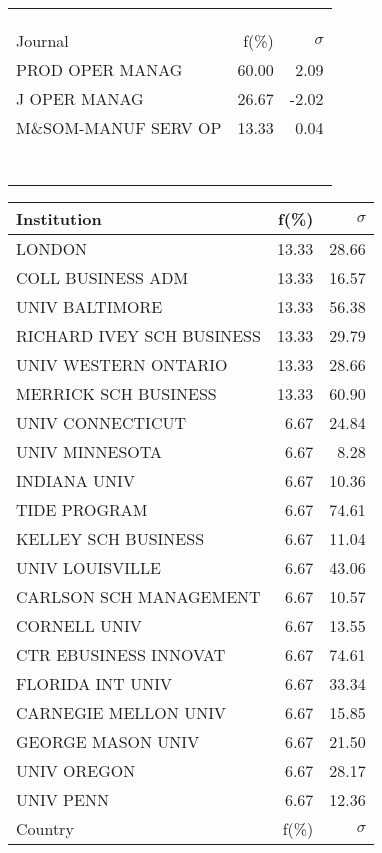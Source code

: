 \documentclass[a4paper,11pt]{report}
\begin{document}
\begin{landscape}
\begin{table}[!ht]
{\begin{tabular}{|l r  r|}
 &  & \\
 &  & \\
 &  & \\
\hline
\hline
Journal & f(\%) & $\sigma$\\
\hline
PROD OPER MANAG & 60.00 & 2.09\\
J OPER MANAG & 26.67 & -2.02\\
M\&SOM-MANUF SERV OP & 13.33 & 0.04\\
 &  & \\
 &  & \\
 &  & \\
 &  & \\
 &  & \\
 &  & \\
 &  & \\
\hline
\end{tabular}
}
{\scriptsize\begin{tabular}{|l r r|}
\hline
Institution & f(\%) & $\sigma$\\
\hline
LONDON & 13.33 & 28.66\\
COLL BUSINESS ADM & 13.33 & 16.57\\
UNIV BALTIMORE & 13.33 & 56.38\\
RICHARD IVEY SCH BUSINESS & 13.33 & 29.79\\
UNIV WESTERN ONTARIO & 13.33 & 28.66\\
MERRICK SCH BUSINESS & 13.33 & 60.90\\
UNIV CONNECTICUT & 6.67 & 24.84\\
UNIV MINNESOTA & 6.67 & 8.28\\
INDIANA UNIV & 6.67 & 10.36\\
TIDE PROGRAM & 6.67 & 74.61\\
KELLEY SCH BUSINESS & 6.67 & 11.04\\
UNIV LOUISVILLE & 6.67 & 43.06\\
CARLSON SCH MANAGEMENT & 6.67 & 10.57\\
CORNELL UNIV & 6.67 & 13.55\\
CTR EBUSINESS INNOVAT & 6.67 & 74.61\\
FLORIDA INT UNIV & 6.67 & 33.34\\
CARNEGIE MELLON UNIV & 6.67 & 15.85\\
GEORGE MASON UNIV & 6.67 & 21.50\\
UNIV OREGON & 6.67 & 28.17\\
UNIV PENN & 6.67 & 12.36\\
\hline
\hline
Country & f(\%) & $\sigma$\\
\hline

\end{tabular}}
\end{table}
\end{landscape}
\end{document}

